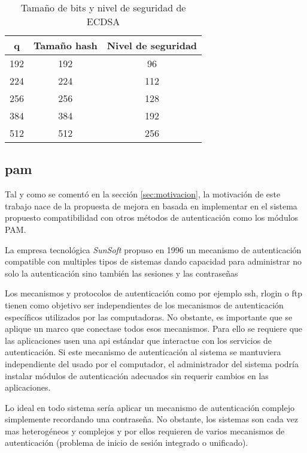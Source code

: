 \begin{table}[H]
    \centering
    \begin{tabular}{ |c|c|c| }
        \hline
        q   & Tamaño hash & Nivel de seguridad \\
        \hline
        192 & 192         & 96                 \\
        224 & 224         & 112                \\
        256 & 256         & 128                \\
        384 & 384         & 192                \\
        512 & 512         & 256                \\
        \hline
    \end{tabular}
    \caption{Tamaño de bits y nivel de seguridad de ECDSA}
    \label{tab:bit-len-sec-level}
\end{table}

\subsection{\acrfull{pam}}

Tal y como se comentó en la sección \ref{sec:motivacion}, la motivación de este trabajo nace de la propuesta de mejora en 
\cite{tesisIliaBlockin} basada en implementar en el sistema propuesto compatibilidad con otros métodos de autenticación como
los módulos PAM.

La empresa tecnológica \textit{SunSoft} propuso en 1996 \cite{samar1996unified} un mecanismo de autenticación compatible con 
multiples tipos de sistemas dando capacidad para administrar no solo la autenticación sino también las sesiones y las contraseñas

Los mecanismos y protocolos de autenticación como por ejemplo \acrfull{ssh}, \acrfull{rlogin} o \acrfull{ftp} tienen como objetivo
ser independientes de los mecanismos de autenticación específicos utilizados por las computadoras. No obstante, es importante que 
se aplique un marco que conectase todos esos mecanismos. Para ello se requiere que las aplicaciones usen una \acrfull{api} estándar
que interactue con los servicios de autenticación. Si este mecanismo de autenticación al sistema se mantuviera independiente del 
usado por el computador, el administrador del sistema podría instalar módulos de autenticación adecuados sin requerir cambios en 
las aplicaciones.  

Lo ideal en todo sistema sería aplicar un mecanismo de autenticación complejo simplemente recordando una contraseña. No obstante,
los sistemas son cada vez mas heterogéneos y complejos y por ellos requieren de varios mecanismos de autenticación (problema
de inicio de sesión integrado o unificado).

